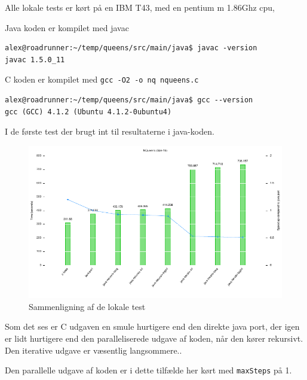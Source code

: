 Alle lokale tests er kørt på en IBM T43, med en pentium m 1.86Ghz cpu, 

Java koden er kompilet med javac

\begin{verbatim}
alex@roadrunner:~/temp/queens/src/main/java$ javac -version
javac 1.5.0_11
\end{verbatim}

C koden er kompilet med \texttt{gcc -O2 -o nq nqueens.c}

\begin{verbatim}
alex@roadrunner:~/temp/queens/src/main/java$ gcc --version
gcc (GCC) 4.1.2 (Ubuntu 4.1.2-0ubuntu4)
\end{verbatim}

I de første test der brugt int til resultaterne i java-koden. 

\begin{figure}[h]
\begin{center}
\includegraphics{../benchmarks/lokal.pdf}
\caption{Sammenligning af de lokale test} 
\label{figur:lokal}
\end{center}
\end{figure}

Som det ses er C udgaven en smule hurtigere end den direkte java port, der igen
er lidt hurtigere end den paralleliserede udgave af koden, når den kører
rekursivt. Den iterative udgave er væsentlig langsommere..

Den parallelle udgave af koden er i dette tilfælde her kørt med
\texttt{maxSteps} på 1. 

